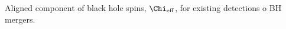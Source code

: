  \label{fig:BHspin} Aligned component of black hole spins, $\Chi_{\rm eff}$, for existing detections o BH mergers.